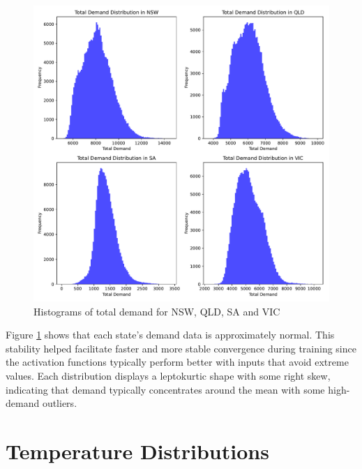 \documentclass[mstat,12pt]{unswthesis}
\begin{document}
\begin{figure}[H]
\centerline{\includegraphics[width=\columnwidth]{Final Report/Figures/Plots/total_demand_distribution.pdf}}
\caption{Histograms of total demand for NSW, QLD, SA and VIC}
\label{demand-distributions-plot}
\end{figure}
Figure \ref{demand-distributions-plot} shows that each state's demand data is approximately normal. This stability helped facilitate faster and more stable convergence during training since the activation functions typically perform better with inputs that avoid extreme values. Each distribution displays a leptokurtic shape with some right skew, indicating that demand typically concentrates around the mean with some high-demand outliers.

\hypertarget{temperature-distributions}{%
\section{Temperature Distributions}\label{temperature-distributions}}
\end{document}
